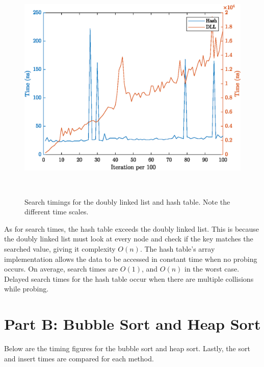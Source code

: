 \documentclass{article}
\begin{document}
\begin{figure}[!htb]
    \centering
    \includegraphics[height=30em]{HashDLLSearch.eps}
    \caption{Search timings for the doubly linked list and hash table. Note the different time scales.}
\end{figure}

As for search times, the hash table exceeds the doubly linked list. This is because the doubly linked list must look at every node and check if the key matches the searched value, giving it complexity \( O(n) \). The hash table's array implementation allows the data to be accessed in constant time when no probing occurs. On average, search times are \( O(1) \), and \( O(n) \) in the worst case. Delayed search times for the hash table occur when there are multiple collisions while probing. 

\newpage

\section*{Part B: Bubble Sort and Heap Sort}
Below are the timing figures for the bubble sort and heap sort. Lastly, the sort and insert times are compared for each method. 
\end{document}
